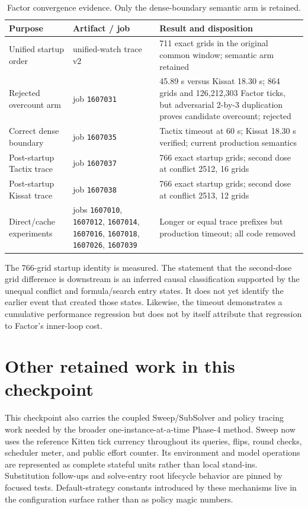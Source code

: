 \documentclass[11pt]{article}
\newcommand{\code}[1]{\nolinkurl{#1}}
\newcommand{\tactix}{Tactix}
\newcommand{\kissat}{Kissat}
\newcommand{\measured}{\textcolor{blue!55!black}{measured}}
\newcommand{\inferred}{\textcolor{orange!65!black}{inferred}}
\begin{document}
\begin{table}[ht]
\centering
\small
\begin{tabular}{L{0.27\textwidth} L{0.29\textwidth} L{0.34\textwidth}}
\toprule
Purpose & Artifact / job & Result and disposition \\
\midrule
Unified startup order & unified-watch trace v2 &
711 exact grids in the original common window; semantic arm retained \\
Rejected overcount arm & job \code{1607031} &
45.89 s versus \kissat{} 18.30 s; 864 grids and 126,212,303 Factor ticks, but
adversarial 2-by-3 duplication proves candidate overcount; rejected \\
Correct dense boundary & job \code{1607035} &
\tactix{} timeout at 60 s; \kissat{} 18.30 s verified; current production
semantics \\
Post-startup \tactix{} trace & job \code{1607037} &
766 exact startup grids; second dose at conflict 2512, 16 grids \\
Post-startup \kissat{} trace & job \code{1607038} &
766 exact startup grids; second dose at conflict 2513, 12 grids \\
Direct/cache experiments & jobs \code{1607010}, \code{1607012},
\code{1607014}, \code{1607016}, \code{1607018}, \code{1607026},
\code{1607039} & Longer or equal trace prefixes but production timeout;
all code removed \\
\bottomrule
\end{tabular}
\caption{Factor convergence evidence.  Only the dense-boundary semantic arm is
retained.}
\label{tab:evidence}
\end{table}

The 766-grid startup identity is \measured{}.  The statement that the
second-dose grid difference is downstream is an \inferred{} causal
classification supported by the unequal conflict and formula/search entry
states.  It does not yet identify the earlier event that created those states.
Likewise, the timeout demonstrates a cumulative performance regression but
does not by itself attribute that regression to Factor's inner-loop cost.

\section{Other retained work in this checkpoint}

This checkpoint also carries the coupled Sweep/SubSolver and policy tracing
work needed by the broader one-instance-at-a-time Phase-4 method.  Sweep now
uses the reference Kitten tick currency throughout its queries, flips, round
checks, scheduler meter, and public effort counter.  Its environment and model
operations are represented as complete stateful units rather than local
stand-ins.  Substitution follow-ups and solve-entry root lifecycle behavior
are pinned by focused tests.  Default-strategy constants introduced by these
mechanisms live in the configuration surface rather than as policy magic
numbers.
\end{document}

